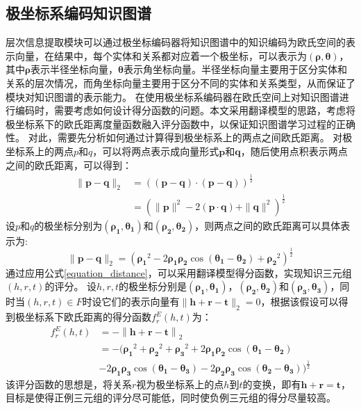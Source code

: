 \documentclass[algorithmlist, AutoFakeBold, AutoFakeSlant, figurelist, tablelist, nomlist, engineering]{seuthesix}
\begin{document}
\subsection{极坐标系编码知识图谱}
层次信息提取模块可以通过极坐标编码器将知识图谱中的知识编码为欧氏空间的表示向量，在结果中，每个实体和关系都对应着一个极坐标，可以表示为$(\bm{\rho}, \bm{\theta})$， 其中$\bm{\rho}$表示半径坐标向量，$\bm{\theta}$表示角坐标向量。半径坐标向量主要用于区分实体和关系的层次情况，而角坐标向量主要用于区分不同的实体和关系类型，从而保证了模块对知识图谱的表示能力。
在使用极坐标系编码器在欧氏空间上对知识图谱进行编码时，需要考虑如何设计得分函数的问题。本文采用翻译模型的思路，考虑将极坐标系下的欧氏距离度量函数融入评分函数中，以保证知识图谱学习过程的正确性。
对此，需要先分析如何通过计算得到极坐标系上的两点之间欧氏距离。
对极坐标系上的两点$p$和$q$，可以将两点表示成向量形式$\bm{p}$和$\bm{q}$，随后使用点积表示两点之间的欧氏距离，可以得到：
\begin{equation}
  \begin{aligned}
  \|\bm{p}-\bm{q}\|_2 & =\left((\bm{p}-\bm{q}) \cdot(\bm{p}-\bm{q})\right)^{\frac{1}{2}} \\
  & =\left(\|\bm{p}\|^2-2(\bm{p} \cdot \bm{q})+\|\bm{q}\|^2\right)^{\frac{1}{2}}
  \end{aligned}
\end{equation}
设$p$和$q$的极坐标分别为$(\bm{\rho_1}, \bm{\theta_1})$和$(\bm{\rho_2}, \bm{\theta_2})$，则两点之间的欧氏距离可以具体表示为:
\begin{equation}
  \|\bm{p}-\bm{q}\|_2=\left(\bm{\rho_1}^2-2 \bm{\rho_1} \bm{\rho_2} \cos \left(\bm{\theta_1}-\bm{\theta_2}\right)+\bm{\rho_2}^2\right)^{\frac{1}{2}}
  \label{equation_distance}
\end{equation}
通过应用公式\ref{equation_distance}，可以采用翻译模型得分函数，实现知识三元组$(h, r, t)$的评分。
设$h, r, t$的极坐标分别是$\left(\bm{\rho_1}, \bm{\theta_1}\right)$，$\left(\bm{\rho_2}, \bm{\theta_2}\right)$和$\left(\bm{\rho_3}, \bm{\theta_3}\right)$，同时当$(h, r, t) \in F$时设它们的表示向量有$\|\bm{h} + \bm{r} - \bm{t}\|_2 = 0$，根据该假设可以得到极坐标系下欧氏距离的得分函数$f^E_r(h, t)$为：
\begin{equation}
  \begin{aligned}
    f^{E}_{r}\left(h, t\right) & =-\left\|\bm{h}+\bm{r}-\bm{t}\right\|_2 \\
    & =-(\bm{\rho_1}^2+\bm{\rho_2}^2+\bm{\rho_3}^2 + 2 \bm{\rho_1} \bm{\rho_2} \cos \left(\bm{\theta_1}-\bm{\theta_2}\right) \\
    & - 2 \bm{\rho_1} \bm{\rho_3} \cos \left(\bm{\theta_1}-\bm{\theta_3}\right) - 2 \bm{\rho_2} \bm{\rho_3} \cos \left(\bm{\theta_2}-\bm{\theta_3}\right))^{\frac{1}{2}}
  \end{aligned}
\end{equation}
该评分函数的思想是，将关系$r$视为极坐标系上的点$h$到$t$的变换，即有$\bm{h} + \bm{r} = \bm{t}$，目标是使得正例三元组的评分尽可能低，同时使负例三元组的得分尽量较高。
\end{document}
